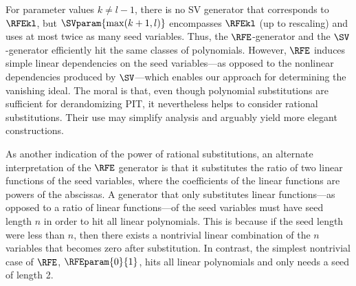 For parameter values $k \ne l-1$,
there is no SV generator that corresponds to $\RFEkl$,
but $\SVparam{\max(k+1,l)}$ encompasses $\RFEkl$ (up to rescaling)
and uses at most twice as many seed variables.
Thus, the $\RFE$-generator and the $\SV$-generator efficiently hit the same
classes of polynomials.
However, $\RFE$ induces simple linear dependencies on the seed variables---as opposed 
to the nonlinear dependencies produced by $\SV$---which enables our approach for determining the vanishing ideal.
The moral is that,
even though polynomial substitutions are sufficient for derandomizing PIT,
it nevertheless helps to consider rational substitutions.
Their use may simplify analysis
and arguably yield more elegant constructions.

As another indication of the power of rational substitutions, an alternate interpretation of the $\RFE$ generator is that it substitutes the ratio of two linear functions of the seed variables, where the coefficients of the linear functions are powers of the abscissas. A generator that only substitutes linear functions---as opposed to a ratio of linear functions---of the seed variables must have seed length $n$ in order to hit all linear polynomials. This is because if the seed length were less than $n$, then there exists a nontrivial linear combination of the $n$ variables that becomes zero after substitution. In contrast, the simplest nontrivial case of $\RFE$, $\RFEparam{0}{1}$, hits all linear polynomials and only needs a seed of length 2. 

